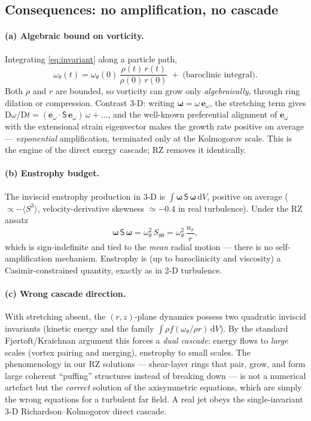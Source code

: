 \documentclass[11pt]{article}
\newcommand{\D}{\mathrm{D}}
\newcommand{\om}{\bm{\omega}}
\begin{document}
\subsection{Consequences: no amplification, no cascade}
\paragraph{(a) Algebraic bound on vorticity.}
Integrating \eqref{eq:invariant} along a particle path,
\begin{equation}
  \omega_\theta(t)
  = \omega_\theta(0)\,\frac{\rho(t)\,r(t)}{\rho(0)\,r(0)}
  \;+\; \text{(baroclinic integral)} .
\end{equation}
Both $\rho$ and $r$ are bounded, so vorticity can grow only
\emph{algebraically}, through ring dilation or compression. Contrast
3-D: writing $\om=\omega\,\bm e_\omega$, the stretching term gives
$\D\omega/\D t = (\bm e_\omega\!\cdot\!\mathsf{S}\,\bm e_\omega)\,\omega + \dots$,
and the well-known preferential alignment of $\bm e_\omega$ with the
extensional strain eigenvector makes the growth rate positive on
average --- \emph{exponential} amplification, terminated only at the
Kolmogorov scale. This is the engine of the direct energy cascade; RZ
removes it identically.

\paragraph{(b) Enstrophy budget.}
The inviscid enstrophy production in 3-D is
$\int \om\,\mathsf{S}\,\om\,\mathrm dV$, positive on average
($\propto -\langle S^3\rangle$, velocity-derivative skewness
$\simeq -0.4$ in real turbulence). Under the RZ ansatz
\begin{equation}
  \om\,\mathsf{S}\,\om = \omega_\theta^{2}\,S_{\theta\theta}
  = \omega_\theta^{2}\,\frac{u_r}{r},
\end{equation}
which is sign-indefinite and tied to the \emph{mean} radial motion ---
there is no self-amplification mechanism. Enstrophy is (up to
baroclinicity and viscosity) a Casimir-constrained quantity, exactly
as in 2-D turbulence.

\paragraph{(c) Wrong cascade direction.}
With stretching absent, the $(r,z)$-plane dynamics possess two
quadratic inviscid invariants (kinetic energy and the family
$\int \rho f(\omega_\theta/\rho r)\,\mathrm dV$). By the standard
Fj\o rtoft/Kraichnan argument this forces a \emph{dual cascade}:
energy flows to \emph{large} scales (vortex pairing and merging),
enstrophy to small scales. The phenomenology in our RZ solutions ---
shear-layer rings that pair, grow, and form large coherent ``puffing''
structures instead of breaking down --- is not a numerical artefact
but the \emph{correct} solution of the axisymmetric equations, which
are simply the wrong equations for a turbulent far field. A real jet
obeys the single-invariant 3-D Richardson--Kolmogorov direct cascade.
\end{document}
